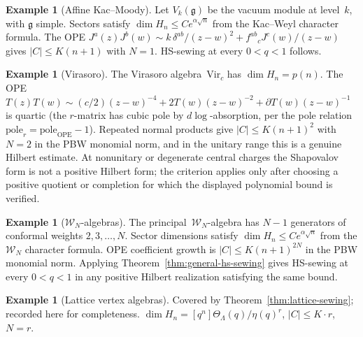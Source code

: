 \documentclass[11pt,reqno]{amsart}
\theoremstyle{definition}
\newtheorem{example}[theorem]{Example}
\theoremstyle{remark}
\newcommand{\cW}{\mathcal{W}}
\newcommand{\Vir}{\mathrm{Vir}}
\newcommand{\fg}{\mathfrak{g}}
\numberwithin{equation}{section}
\begin{document}
\begin{example}[Affine Kac--Moody]\label{ex:kac-moody}
Let $V_k(\fg)$ be the vacuum module at level~$k$, with $\fg$
simple.  Sectors satisfy
$\dim H_n \leq Ce^{\alpha\sqrt{n}}$ from the Kac--Weyl
character formula.  The OPE
$J^a(z)J^b(w) \sim k\,\delta^{ab}/(z-w)^2
+ f^{ab}{}_c J^c(w)/(z-w)$
gives $|C| \leq K(n+1)$ with $N = 1$.  HS-sewing at every
$0 < q < 1$ follows.
\end{example}

\begin{example}[Virasoro]\label{ex:virasoro}
The Virasoro algebra~$\Vir_c$ has $\dim H_n = p(n)$.  The OPE
$T(z)T(w) \sim (c/2)(z-w)^{-4} + 2T(w)(z-w)^{-2}
+ \partial T(w)(z-w)^{-1}$
is quartic (the $r$-matrix has cubic pole by $d\log$-absorption,
per the pole relation $\mathrm{pole}_r = \mathrm{pole}_{\mathrm{OPE}} - 1$).
Repeated normal products give $|C| \leq K(n+1)^2$ with
$N = 2$ in the PBW monomial norm, and in the unitary range this is
a genuine Hilbert estimate.  At nonunitary or degenerate central
charges the Shapovalov form is not a positive Hilbert form; the
criterion applies only after choosing a positive quotient or
completion for which the displayed polynomial bound is verified.
\end{example}

\begin{example}[$\cW_N$-algebras]\label{ex:wn}
The principal~$\cW_N$-algebra has $N-1$ generators of
conformal weights $2,3,\ldots,N$.  Sector dimensions satisfy
$\dim H_n \leq Ce^{\alpha\sqrt{n}}$ from the $\cW_N$ character
formula.  OPE coefficient growth is
$|C| \leq K(n+1)^{2N}$ in the PBW monomial norm.  Applying
Theorem~\ref{thm:general-hs-sewing} gives HS-sewing at every
$0 < q < 1$ in any positive Hilbert realization satisfying the
same bound.
\end{example}

\begin{example}[Lattice vertex algebras]\label{ex:lattice}
Covered by Theorem~\ref{thm:lattice-sewing}; recorded here
for completeness.  $\dim H_n = [q^n]\Theta_\Lambda(q)/\eta(q)^r$,
$|C| \leq K \cdot r$, $N = r$.
\end{example}
\end{document}
